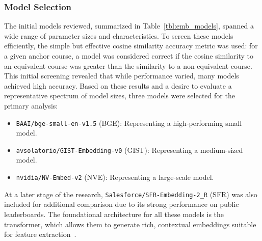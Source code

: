 \subsubsection{Model Selection}\label{ch:3.3.1.1}
The initial models reviewed, summarized in Table~\ref{tbl:emb_models}, spanned a wide range of parameter sizes and characteristics. To screen these models efficiently, the simple but effective cosine similarity accuracy metric was used: for a given anchor course, a model was considered correct if the cosine similarity to an equivalent course was greater than the similarity to a non-equivalent course. This initial screening revealed that while performance varied, many models achieved high accuracy. Based on these results and a desire to evaluate a representative spectrum of model sizes, three models were selected for the primary analysis:
\begin{itemize}
    \item \verb|BAAI/bge-small-en-v1.5| (BGE): Representing a high-performing small model.
    \item \verb|avsolatorio/GIST-Embedding-v0| (GIST): Representing a medium-sized model.
    \item \verb|nvidia/NV-Embed-v2| (NVE): Representing a large-scale model.
\end{itemize}
At a later stage of the research, \verb|Salesforce/SFR-Embedding-2_R| (SFR) was also included for additional comparison due to its strong performance on public leaderboards. The foundational architecture for all these models is the transformer, which allows them to generate rich, contextual embeddings suitable for feature extraction~\cite{NIPS2017_3f5ee243}.
